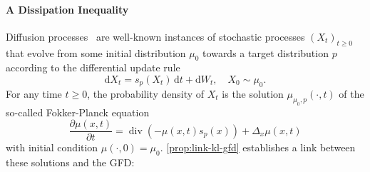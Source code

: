 \documentclass{uai2023} %
\begin{document}
\paragraph{A Dissipation Inequality}
Diffusion processes~\citep{rogers2000diffusions} are well-known instances of
stochastic processes $ (X_t)_{t \geq  0} $ that evolve from some
initial distribution $ \mu_0 $ towards a target distribution $ p $ according to
the differential update rule
\begin{equation*}
    \mathrm{d}X_t = s_p(X_t) \,\mathrm{d}t + \mathrm{d}W_t, \quad X_0 \sim \mu_0.
\end{equation*}
For any time $ t \geq  0 $, the probability density of $ X_t $ is the solution $\mu_{\mu_0, p}(\cdot, t)$
of the so-called Fokker-Planck equation
\begin{equation}\label{eq:fp}
    \frac{\partial \mu(x, t)}{\partial t} = \operatorname{div}(-\mu(x, t) s_p(x)) + \Delta_x \mu(x, t)
\end{equation}
with initial condition $ \mu(\cdot, 0) = \mu_0 $.
\cref{prop:link-kl-gfd} establishes a link between these solutions and the GFD:
\end{document}
